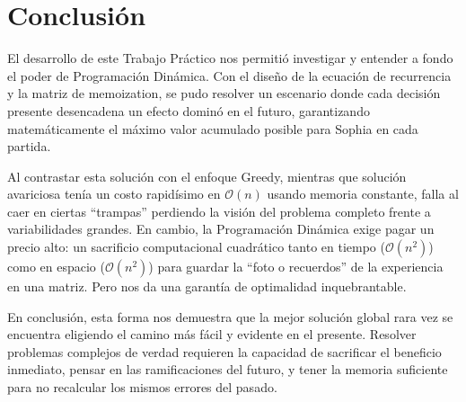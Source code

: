 \section{Conclusión}

El desarrollo de este Trabajo Práctico nos permitió investigar y entender a fondo el poder de Programación Dinámica. Con el diseño de la ecuación de recurrencia y la matriz de memoization, se pudo resolver un escenario donde cada decisión presente desencadena un efecto dominó en el futuro, garantizando matemáticamente el máximo valor acumulado posible para Sophia en cada partida.

Al contrastar esta solución con el enfoque Greedy, mientras que solución avariciosa tenía un costo rapidísimo en $\mathcal{O}(n)$ usando memoria constante, falla al caer en ciertas ``trampas'' perdiendo la visión del problema completo frente a variabilidades grandes. En cambio, la Programación Dinámica exige pagar un precio alto: un sacrificio computacional cuadrático tanto en tiempo ($\mathcal{O}(n^2)$) como en espacio ($\mathcal{O}(n^2)$) para guardar la ``foto o recuerdos'' de la experiencia en una matriz. Pero nos da una garantía de optimalidad inquebrantable.

En conclusión, esta forma nos demuestra que la mejor solución global rara vez se encuentra eligiendo el camino más fácil y evidente en el presente. Resolver problemas complejos de verdad requieren la capacidad de sacrificar el beneficio inmediato, pensar en las ramificaciones del futuro, y tener la memoria suficiente para no recalcular los mismos errores del pasado.
